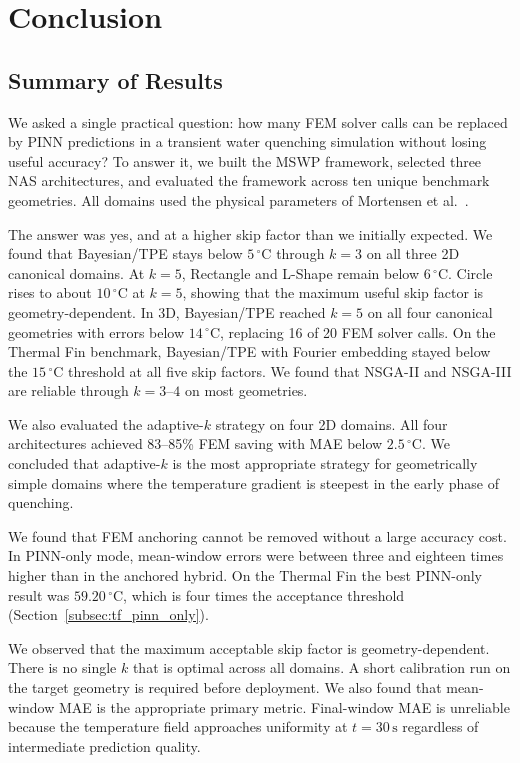 \chapter{Conclusion}
\label{chap:conclusion}

\section{Summary of Results}
\label{sec:conc_summary}

We asked a single practical question: how many FEM solver calls can be replaced
by PINN predictions in a transient water quenching simulation without losing
useful accuracy?
To answer it, we built the MSWP framework, selected three NAS architectures,
and evaluated the framework across ten unique benchmark geometries.
All domains used the physical parameters of Mortensen et al.~\cite{mortensen2026}.

The answer was yes, and at a higher skip factor than we initially expected.
We found that Bayesian/TPE stays below $5\,^\circ\mathrm{C}$ through $k=3$
on all three 2D canonical domains.
At $k=5$, Rectangle and L-Shape remain below $6\,^\circ\mathrm{C}$.
Circle rises to about $10\,^\circ\mathrm{C}$ at $k=5$, showing that the maximum
useful skip factor is geometry-dependent.
In 3D, Bayesian/TPE reached $k=5$ on all four canonical geometries with errors
below $14\,^\circ\mathrm{C}$, replacing 16 of 20 FEM solver calls.
On the Thermal Fin benchmark, Bayesian/TPE with Fourier embedding stayed below
the $15\,^\circ\mathrm{C}$ threshold at all five skip factors.
We found that NSGA-II and NSGA-III are reliable through $k=3$--$4$ on most
geometries.

We also evaluated the adaptive-$k$ strategy on four 2D domains.
All four architectures achieved 83--85\% FEM saving with MAE below
$2.5\,^\circ\mathrm{C}$.
We concluded that adaptive-$k$ is the most appropriate strategy for geometrically
simple domains where the temperature gradient is steepest in the early phase
of quenching.

We found that FEM anchoring cannot be removed without a large accuracy cost.
In PINN-only mode, mean-window errors were between three and eighteen times
higher than in the anchored hybrid.
On the Thermal Fin the best PINN-only result was $59.20\,^\circ\mathrm{C}$,
which is four times the acceptance threshold
(Section~\ref{subsec:tf_pinn_only}).

We observed that the maximum acceptable skip factor is geometry-dependent.
There is no single $k$ that is optimal across all domains.
A short calibration run on the target geometry is required before deployment.
We also found that mean-window MAE is the appropriate primary metric.
Final-window MAE is unreliable because the temperature field approaches
uniformity at $t=30\,\mathrm{s}$ regardless of intermediate prediction quality.

